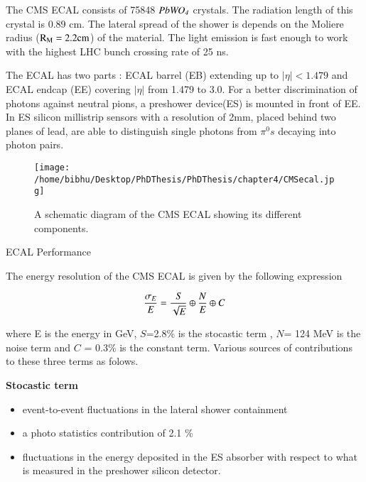 The CMS ECAL consists of 75848 $\it PbWO_{4}$ crystals. The radiation length of this crystal is 0.89 cm. The lateral spread of the shower is depends on the Moliere radius ($\rm R_{M}= 2.2 cm$) of the material. The light emission is fast enough to work with the highest LHC bunch crossing rate of 25 ns. 

The ECAL has two parts : ECAL barrel (EB) extending up to $|\eta| < 1.479$ and ECAL endcap (EE) covering $|\eta|$ from 1.479 to 3.0.  For a better discrimination of photons against neutral pions, a preshower device(ES) is mounted in front of EE. In ES silicon millistrip sensors with a resolution of 2mm, placed behind two planes of lead, are able to distinguish single photons from $\pi^{0}s$ decaying into photon pairs.

\begin{figure}[H]
    \centering  
    \texttt{[image: /home/bibhu/Desktop/PhDThesis/PhDThesis/chapter4/CMSecal.jpg]}
    \caption{ \small A schematic diagram of the CMS ECAL  showing its different components.}
    \label{fig:CMSecal}
\end{figure}


{\Large ECAL Performance }

The energy resolution of the CMS ECAL is given by  the following expression 


\begin{equation} \label{ecalresolution}
\it \frac{\sigma_{E}}{E} = \frac{S}{\sqrt{E}} \oplus \frac{N}{E} \oplus C
\end{equation}
 
where E is the energy in GeV, $S$=2.8\% is the stocastic term , $N$= 124 MeV is the noise term and $C$ = 0.3\% is the constant term. Various sources of contributions to these three terms as folows.

{\bf Stocastic term}
\vspace{-0.2in}
\begin{itemize}
\item event-to-event fluctuations in the lateral shower containment \vspace{-0.2in}
\item a photo statistics contribution of 2.1 \% \vspace{-0.2in}
\item fluctuations in the energy deposited in the ES absorber with respect to what is measured in the preshower silicon detector. \vspace{-0.2in}
\end{itemize} 

